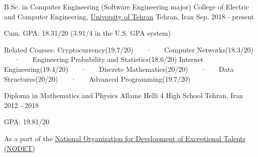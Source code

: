 

\begin{cventries}

  \cventry
    {B.Sc. in Computer Engineering (Software Engineering major)} %
    {College of Electric and Computer Engineering, \href{https://ece.ut.ac.ir/en/ece}{University of Tehran}} %
    {Tehran, Iran} %
    {Sep. 2018 - present} %
    {
      \begin{cvitems} %
        \item {Cum. GPA: 18.31/20 (3.91/4 in the U.S. GPA system)}
        \item {Related Courses: Cryptocurrency(19.7/20) ~~~·~~~ Computer Networks(18.3/20) ~~~·~~~ Engineering Probability and Statistics(18.6/20)  \newline Internet Engineering(19.4/20) ~~~·~~~ Discrete Mathematics(20/20) ~~~·~~~ Data Structures(20/20) ~~~·~~~ Advanced Programming(19.7/20)}
      \end{cvitems}
    }

  \cventry
    {Diploma in Mathematics and Physics} %
    {Allame Helli 4 High School} %
    {Tehran, Iran} %
    {2012 - 2018} %
    {
      \begin{cvitems} %
        \item {GPA: 19.81/20}
        \item {As a part of the \href{https://en.wikipedia.org/wiki/National_Organization_for_Development_of_Exceptional_Talents}{National Organization for Development of Exceptional Talents (NODET)}}
      \end{cvitems}
    }

\end{cventries}
